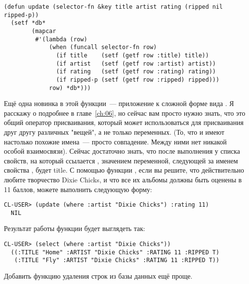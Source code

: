 \begin{lstlisting}
(defun update (selector-fn &key title artist rating (ripped nil ripped-p))
  (setf *db*
        (mapcar
         #'(lambda (row)
             (when (funcall selector-fn row)
               (if title    (setf (getf row :title) title))
               (if artist   (setf (getf row :artist) artist))
               (if rating   (setf (getf row :rating) rating))
               (if ripped-p (setf (getf row :ripped) ripped)))
             row) *db*)))
\end{lstlisting}

Ещё одна новинка в этой функции~--- приложение  к
сложной форме вида . Я расскажу о  подробнее в главе~\ref{ch:06},
но сейчас вам просто нужно знать, что это общий оператор присваивания, который может
использоваться для присваивания друг другу различных "вещей", а не только переменных. (То,
что  и  имеют настолько похожие имена~--- просто совпадение. Между
ними нет никакой особой взаимосвязи). Сейчас достаточно знать, что после выполнения
 у списка свойств, на который ссылается ,
значением переменной, следующей за именем свойства , будет title. С помощью
функции , если вы решите, что действительно любите творчество Dixie Chicks, и
что все их альбомы должны быть оценены в 11 баллов, можете выполнить следующую
форму:

\begin{lstlisting}[style=lisprepl]
  CL-USER> (update (where :artist "Dixie Chicks") :rating 11)
  NIL
\end{lstlisting}

Результат работы функции будет выглядеть так:

\begin{lstlisting}[style=lisprepl]
  CL-USER> (select (where :artist "Dixie Chicks"))
  ((:TITLE "Home" :ARTIST "Dixie Chicks" :RATING 11 :RIPPED T)
   (:TITLE "Fly" :ARTIST "Dixie Chicks" :RATING 11 :RIPPED T))
\end{lstlisting}

Добавить функцию удаления строк из базы данных ещё проще.

